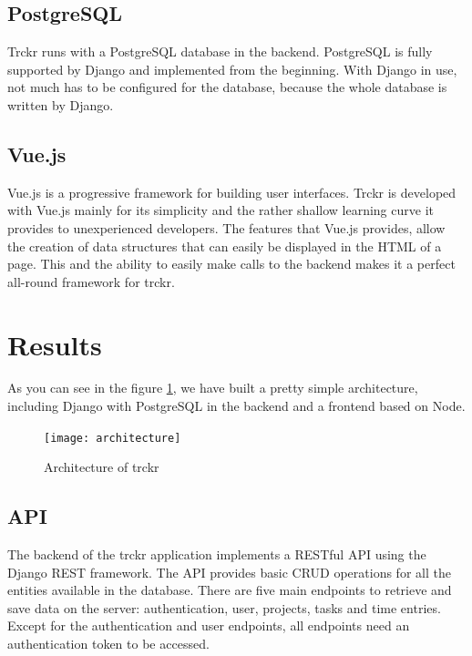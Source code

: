 \documentclass[a4paper, 12pt, headsepline]{scrartcl}
\begin{document}
\subsection{PostgreSQL}
Trckr runs with a PostgreSQL database in the backend. PostgreSQL is fully supported by Django and
implemented from the beginning. With Django in use, not much has to be configured for the database, because
the whole database is written by Django.

\subsection{Vue.js}
Vue.js is a progressive framework for building user interfaces.\cite{vuejs} Trckr is developed with Vue.js mainly for its simplicity and the rather shallow learning curve it provides to unexperienced developers.
The features that Vue.js provides, allow the creation of data structures that can easily be displayed in the HTML of a page. This and the ability to easily make calls to the backend makes it a perfect all-round framework for trckr.


\section{Results}
As you can see in the figure \ref{fig:architecture}, we have built a pretty simple architecture,
including Django with PostgreSQL in the backend and a frontend based on Node.

\begin{figure}[h]
    \texttt{[image: architecture]}
    \caption{Architecture of trckr}
    \label{fig:architecture}
\end{figure}

\subsection{API}
The backend of the trckr application implements a RESTful API using the Django
REST framework. The API provides basic CRUD operations for all the entities
available in the database. There are five main endpoints to retrieve and save
data on the server: authentication, user, projects, tasks and time entries. Except
for the authentication and user endpoints, all endpoints need an authentication
token to be accessed.
\end{document}
